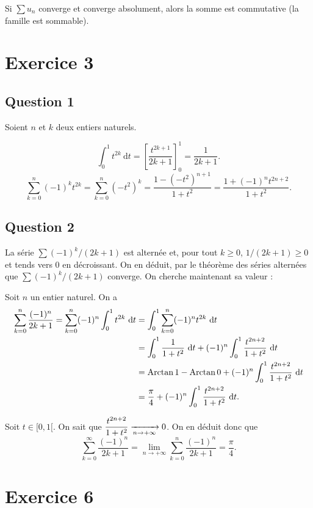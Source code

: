 Si $\sum u_n$\/ converge et converge absolument, alors la somme est commutative (la famille est sommable).


\section{Exercice 3}
\subsection{Question 1}

Soient $n$\/ et $k$\/ deux entiers naturels.

\[
	\int_{0}^{1} t^{2k}~\mathrm{d}t = \left[ \frac{t^{2k+1}}{2k+1} \right]_0^{1} = \frac{1}{2k+1}
.\]
\[
	\sum_{k=0}^{n} (-1)^k t^{2k} = \sum_{k=0}^n (-t^2)^k = \frac{1 - (-t^2)^{n+1}}{1 + t^2} = \frac{1 + (-1)^nt^{2n+2}}{1+t^2}
.\]

\subsection{Question 2}

La série $\sum (-1)^k / (2k+1)$\/ est alternée et, pour tout $k \ge 0$, $1 / (2k+1) \ge 0$\/ et tends vers 0 en décroissant. On en déduit, par le théorème des séries alternées que $\sum (-1)^k / (2k+1)$\/ converge. On cherche maintenant sa valeur :

Soit $n$\/ un entier naturel. On a
\begin{align*}
	\sum_{k=0}^n \frac{(-1)^n}{2k+1} = \sum_{k=0}^n(-1)^n\int_{0}^{1} t^{2k}~\mathrm{d}t &= \int_{0}^{1} \sum_{k=0}^n (-1)^n t^{2k} ~\mathrm{d}t\\
	&= \int_{0}^{1} \frac{1}{1+t^2}~\mathrm{d}t + (-1)^n \int_{0}^{1} \frac{t^{2n+2}}{1+t^2}~\mathrm{d}t \\
	&= \operatorname{Arctan} 1 - \operatorname{Arctan} 0 + (-1)^n \int_{0}^{1} \frac{t^{2n+2}}{1+t^2}~\mathrm{d}t \\
	&= \frac{\pi}{4} + (-1)^n \int_{0}^{1} \frac{t^{2n+2}}{1+t^2}~\mathrm{d}t. \\
\end{align*}

Soit $t \in [0,1[$. On sait que $\displaystyle \frac{t^{2n+2}}{1+t^2} \xrightarrow[n\to +\infty]{} 0$. On en déduit donc que \[
	\sum_{k=0}^\infty \frac{(-1)^n}{2k+1} = \lim_{n\to +\infty} \sum_{k=0}^n \frac{(-1)^n}{2k+1} = \frac{\pi}{4}
.\]

\section{Exercice 6}

